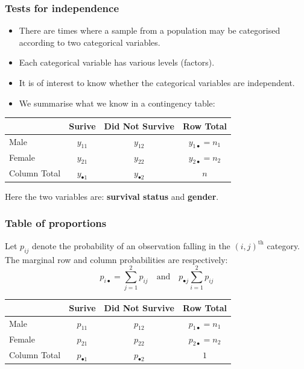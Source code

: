 \documentclass[a4paper]{article}\usepackage[]{graphicx}\usepackage[]{xcolor}
\begin{document}
\subsubsection{Tests for independence}
\begin{itemize}
	\item There are times where a sample from a population may be categorised according to two categorical variables.
	\item Each categorical variable has various levels (factors).
	\item It is of interest to know whether the categorical variables are independent.
	\item We summarise what we know in a contingency table:
\end{itemize}
\begin{table}[H]
	\centering
	\begin{tabular}{@{}lcc|c@{}}
	\toprule
				 & Surive  			   & Did Not Survive 	  & Row Total                 \\ \midrule
	Male   	  	 & \( y_{11} \)		   & \( y_{12} \) 	      & \( y_{1 \bullet} = n_1 \) \\
	Female   	 & \( y_{21} \) 	   & \( y_{22} \) 	      & \( y_{2 \bullet} = n_2 \) \\ \midrule
	Column Total & \( y_{\bullet 1} \) & \( y_{\bullet 2} \)  & \( n \) 				  \\ \bottomrule
	\end{tabular}
\end{table}
Here the two variables are: \textbf{survival status} and \textbf{gender}.
\subsubsection{Table of proportions}
Let \( p_{ij} \) denote the probability of an observation falling in the \( (i,j)^{\text{th}} \) category. The marginal row and column probabilities are respectively:
\[
	p_{i \bullet} = \sum_{j=1}^{2} p_{ij} \quad\text{and}\quad p_{\bullet j} \sum_{i=1}^{2} p_{ij}
\]
\begin{table}[H]
	\centering
	\begin{tabular}{@{}lcc|c@{}}
	\toprule
				 & Surive  			   & Did Not Survive 	  & Row Total                 \\ \midrule
	Male   	  	 & \( p_{11} \)		   & \( p_{12} \) 	      & \( p_{1 \bullet} = n_1 \) \\
	Female   	 & \( p_{21} \) 	   & \( p_{22} \) 	      & \( p_{2 \bullet} = n_2 \) \\ \midrule
	Column Total & \( p_{\bullet 1} \) & \( p_{\bullet 2} \)  & \( 1 \) 				  \\ \bottomrule
	\end{tabular}
\end{table}
\end{document}
